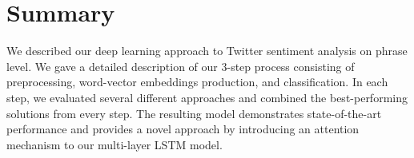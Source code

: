 \section{Summary}
We described our deep learning approach to Twitter sentiment analysis on phrase level. We gave a detailed description of our 3-step process consisting of preprocessing, word-vector embeddings production, and classification. In each step, we evaluated several different approaches and combined the best-performing solutions from every step. The resulting model demonstrates state-of-the-art performance and provides a novel approach by introducing an attention mechanism to our multi-layer LSTM model. 